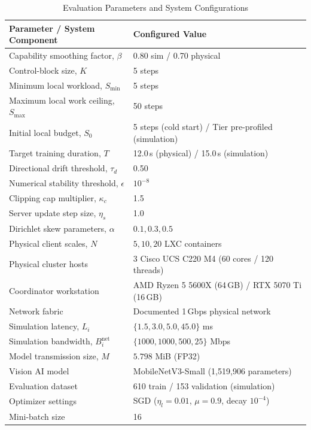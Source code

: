 \documentclass[conference]{IEEEtran}
\begin{document}
\begin{table}[t]
\caption{Evaluation Parameters and System Configurations}
\label{tab:setup}
\centering
\scriptsize
\renewcommand{\arraystretch}{1.03}
\begin{tabular}{p{}p{}}
\toprule
\textbf{Parameter / System Component} & \textbf{Configured Value}\\
\midrule
Capability smoothing factor, $\beta$ & 0.80 sim / 0.70 physical\\
Control-block size, $K$ & 5 steps\\
Minimum local workload, $S_{\min}$ & 5 steps\\
Maximum local work ceiling, $S_{\max}$ & 50 steps\\
Initial local budget, $S_0$ & 5 steps (cold start) / Tier pre-profiled (simulation)\\
Target training duration, $T$ & 12.0\,s (physical) / 15.0\,s (simulation)\\
Directional drift threshold, $\tau_d$ &
0.50\\
Numerical stability threshold, $\epsilon$ & $10^{-8}$\\
Clipping cap multiplier, $\kappa_c$ & 1.5\\
Server update step size, $\eta_s$ & 1.0\\
Dirichlet skew parameters, $\alpha$ & $0.1, 0.3, 0.5$\\
Physical client scales, $N$ & $5, 10, 20$ LXC containers\\
Physical cluster hosts & 3 Cisco UCS C220 M4 (60 cores / 120 threads)\\
Coordinator workstation & AMD Ryzen 5 5600X (64\,GB) / RTX 5070 Ti (16\,GB)\\
Network fabric &
Documented 1\,Gbps physical network\\
Simulation latency, $L_i$ &
$\{1.5,3.0,5.0,45.0\}$ ms\\
Simulation bandwidth, $B_i^{\mathrm{net}}$ &
$\{1000,1000,500,25\}$ Mbps\\
Model transmission size, $M$ &
$5.798$ MiB (FP32)\\
Vision AI model &
MobileNetV3-Small (1,519,906 parameters)\\
Evaluation dataset & 610 train / 153 validation (simulation)\\
Optimizer settings & SGD ($\eta_l = 0.01$, $\mu = 0.9$, decay $10^{-4}$)\\
Mini-batch size & 16\\
\bottomrule
\end{tabular}
\end{table}
\end{document}
